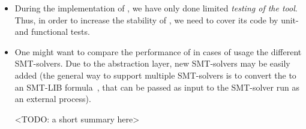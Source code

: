 \begin{itemize}[leftmargin=\parindent]
\item During the implementation of \porthos[2], we have only done limited \textit{testing of the tool}.
Thus, in order to increase the stability of \porthos[2], we need to cover its code by unit- and functional tests.

\item One might want to compare the performance of \porthos[2] in cases of usage the different SMT-solvers.
Due to the \zformula{} abstraction layer, new SMT-solvers may be easily added (the general way to support multiple SMT-solvers is to convert the \zformula{} to an SMT-LIB formula~\cite{smt-lib}, that can be passed as input to the SMT-solver run as an external process).

<TODO: a short summary here>

\end{itemize}
